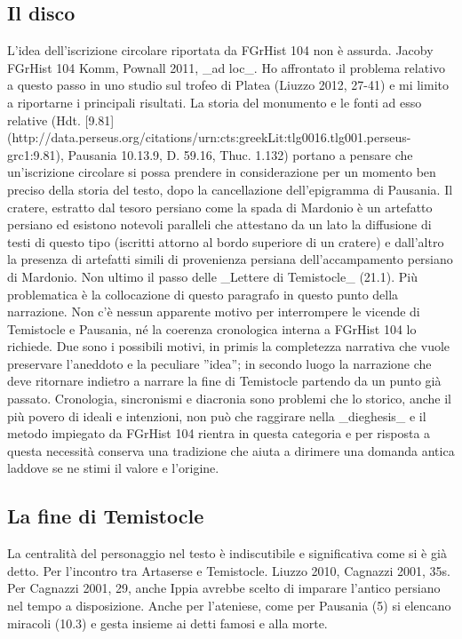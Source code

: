 {            \subsection*{Il disco}
            L'idea dell'iscrizione circolare riportata da FGrHist 104 non è assurda. Jacoby FGrHist 104 Komm, Pownall 2011, _ad loc_. Ho affrontato il problema relativo a questo passo in uno studio sul trofeo di Platea (Liuzzo 2012, 27-41) e mi limito a riportarne i principali risultati. La storia del monumento e le fonti ad esso relative (Hdt. [9.81](http://data.perseus.org/citations/urn:cts:greekLit:tlg0016.tlg001.perseus-grc1:9.81), Pausania 10.13.9, D. 59.16, Thuc. 1.132) portano a pensare che un'iscrizione circolare si possa prendere in considerazione per un momento ben preciso della storia del testo, dopo la cancellazione dell'epigramma di Pausania. Il cratere, estratto dal tesoro persiano come la spada di Mardonio è un artefatto persiano ed esistono notevoli paralleli che attestano da un lato la diffusione di testi di questo tipo (iscritti attorno al bordo superiore di un cratere) e dall'altro la presenza di artefatti simili di provenienza persiana dell'accampamento persiano di Mardonio. Non ultimo il passo delle _Lettere di Temistocle_ (21.1). Più problematica è la collocazione di questo paragrafo in questo punto della narrazione. Non c'è nessun apparente motivo per interrompere le vicende di Temistocle e Pausania, né la coerenza cronologica interna a FGrHist 104 lo richiede. Due sono i possibili motivi, in primis la completezza narrativa che vuole preservare l'aneddoto e la peculiare ''idea''; in secondo luogo la narrazione che deve ritornare indietro a narrare la fine di Temistocle partendo da un punto già passato. Cronologia, sincronismi e diacronia sono problemi che lo storico, anche il più povero di ideali e intenzioni, non può che raggirare nella _dieghesis_ e il metodo impiegato da FGrHist 104 rientra in questa categoria e per risposta a questa necessità conserva una tradizione che aiuta a dirimere una domanda antica laddove se ne stimi il valore e l'origine.
            \subsection*{La fine di Temistocle}
           La centralità del personaggio nel testo è indiscutibile e significativa come si è già detto. Per l'incontro tra Artaserse  e Temistocle. Liuzzo 2010, Cagnazzi 2001, 35s. Per Cagnazzi 2001, 29, anche Ippia  avrebbe scelto di imparare l'antico persiano nel tempo a disposizione. Anche per l'ateniese, come per Pausania  (5) si elencano miracoli (10.3) e gesta insieme ai detti famosi e alla morte. 
}
